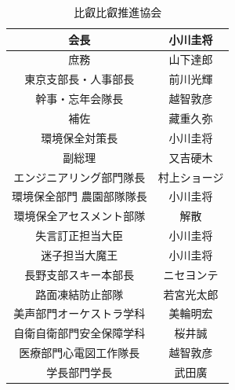 \begin{table}[htb]
\begin{center}
\begin{tabular}{|c|c|} 
\hline
	会長 & 小川圭将\tabularnewline  \hline
庶務 & 山下達郎\tabularnewline  \hline
東京支部長・人事部長 & 前川光輝\tabularnewline  \hline
幹事・忘年会隊長 & 越智敦彦\tabularnewline  \hline
補佐 & 藏重久弥\tabularnewline  \hline
環境保全対策長 & 小川圭将\tabularnewline  \hline
副総理 & 又吉硬木\tabularnewline  \hline
エンジニアリング部門隊長 & 村上ショージ\tabularnewline  \hline
環境保全部門 農園部隊隊長 & 小川圭将\tabularnewline  \hline
環境保全アセスメント部隊 & 解散\tabularnewline  \hline
失言訂正担当大臣 & 小川圭将\tabularnewline  \hline
迷子担当大魔王 & 小川圭将\tabularnewline  \hline
長野支部スキー本部長 & ニセヨンテ\tabularnewline  \hline
路面凍結防止部隊 & 若宮光太郎\tabularnewline  \hline
美声部門オーケストラ学科 & 美輪明宏\tabularnewline  \hline
自衛自衛部門安全保障学科 & 桜井誠\tabularnewline  \hline
医療部門心電図工作隊長 & 越智敦彦\tabularnewline  \hline
学長部門学長 &武田廣\tabularnewline 
	\hline
	\end{tabular}
	\end{center}
	\caption{比叡比叡推進協会}  
	\label{gas1}
\end{table}

\newpage
